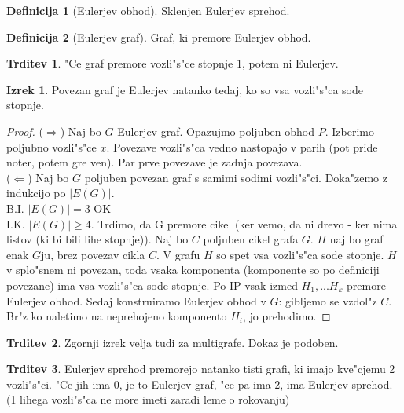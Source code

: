 \documentclass{article}
\theoremstyle{definition}
\newtheorem{definition}{Definicija}[section]
\newtheorem{claim}{Trditev}[section]
\newtheorem{theorem}{Izrek}[section]
\begin{document}
	\begin{definition}[Eulerjev obhod]
		Sklenjen Eulerjev sprehod.
	\end{definition}
	
	\begin{definition}[Eulerjev graf]
		Graf, ki premore Eulerjev obhod.
	\end{definition}

	\begin{claim}
		"Ce graf premore vozli"s"ce stopnje $1$, potem ni Eulerjev.
	\end{claim}

	\begin{theorem}
		Povezan graf je Eulerjev natanko tedaj, ko so vsa vozli"s"ca sode stopnje.
		\begin{proof}
			($\Rightarrow$) Naj bo $G$ Eulerjev graf. Opazujmo poljuben obhod $P$. Izberimo poljubno vozli"s"ce $x$. Povezave vozli"s"ca vedno nastopajo v parih (pot pride noter, potem gre ven). Par prve povezave je zadnja povezava. \\
			($\Leftarrow$) Naj bo $G$ poljuben povezan graf s samimi sodimi vozli"s"ci. Doka"zemo z indukcijo po $|E(G)|$.\\
			B.I. $|E(G)| = 3$ OK \\
			I.K. $|E(G)| \geq 4$. Trdimo, da G premore cikel (ker vemo, da ni drevo - ker nima listov (ki bi bili lihe stopnje)). Naj bo $C$ poljuben cikel grafa $G$. $H$ naj bo graf enak $G$ju, brez povezav cikla $C$. V grafu $H$ so spet vsa vozli"s"ca sode stopnje. $H$ v splo"snem ni povezan, toda vsaka komponenta (komponente so po definiciji povezane) ima vsa vozli"s"ca sode stopnje. Po IP vsak izmed $H_1, ... H_k$ premore Eulerjev obhod. Sedaj konstruiramo Eulerjev obhod v $G$: gibljemo se vzdol"z $C$. Br"z ko naletimo na neprehojeno komponento $H_i$, jo prehodimo.
		\end{proof}
	\end{theorem}
	\begin{claim}
		Zgornji izrek velja tudi za multigrafe. Dokaz je podoben.
	\end{claim}
	
	\begin{claim}
		Eulerjev sprehod premorejo natanko tisti grafi, ki imajo kve"cjemu 2 vozli"s"ci. "Ce jih ima 0, je to Eulerjev graf, "ce pa ima 2, ima Eulerjev sprehod. (1 lihega vozli"s"ca ne more imeti zaradi leme o rokovanju)
	\end{claim}
\end{document}
